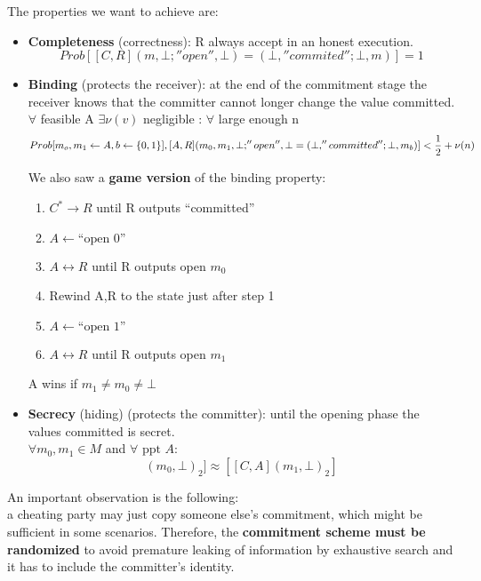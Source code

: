 \documentclass{article}
\begin{document}
The properties we want to achieve are:
\begin{itemize}
\item \textbf{Completeness} (correctness): R always accept in an honest execution.
\begin{equation}
Prob[[C,R](m,\bot;''open '',\bot) = (\bot,''commited '';\bot,m)] = 1
\end{equation}
\item \textbf{Binding} (protects the receiver): at the end of the commitment stage the receiver knows that the committer cannot longer change the value committed.\\

$\forall$ feasible A $\exists \nu(v)$ negligible : $\forall$ large enough n
\begin{equation}
Prob[m_o,m_1 \leftarrow A, b \leftarrow \{0,1\}], [A,R](m_0,m_1,\bot;''open'',\bot = (\bot,''committed'';\bot,m_b)] < {1 \over 2} + \nu(n)
\end{equation}

We also saw a \textbf{game version} of the binding property:
\begin{enumerate}
\item $C^* \rightarrow R$ until R outputs ``committed''
\item  $A \leftarrow \text{``open 0''}$
\item $A \leftrightarrow R$ until R outputs open $m_0$
\item Rewind A,R to the state just after step 1
\item  $A \leftarrow \text{``open 1''}$
\item $A \leftrightarrow R$ until R outputs open $m_1$
\end{enumerate}
A wins if $m_1 \neq m_0 \neq \bot$

\item \textbf{Secrecy} (hiding) (protects the committer): until the opening phase the values committed is secret.\\

$\forall m_0,m_1 \in M$ and $\forall \text{ ppt } A$:
\begin{equation}
[[C,A](m_0,\bot)_2] \approx [[C,A](m_1,\bot)_2]
\end{equation}
\end{itemize}


An important observation is the following:\\
a cheating party may just copy someone else’s commitment, which might be sufficient
in some scenarios. Therefore, the \textbf{commitment scheme must be randomized} to
avoid premature leaking of information by exhaustive search and it has to include the
committer’s identity.
\end{document}
